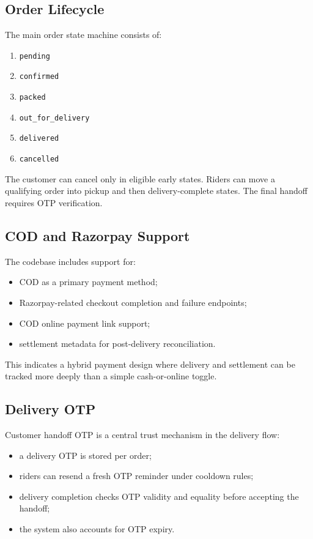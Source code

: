 \documentclass[12pt,a4paper]{article}
\begin{document}
\subsection{Order Lifecycle}
The main order state machine consists of:
\begin{enumerate}[leftmargin=1.5em]
    \item \texttt{pending}
    \item \texttt{confirmed}
    \item \texttt{packed}
    \item \texttt{out\_for\_delivery}
    \item \texttt{delivered}
    \item \texttt{cancelled}
\end{enumerate}

The customer can cancel only in eligible early states. Riders can move a qualifying order into pickup and then delivery-complete states. The final handoff requires OTP verification.

\subsection{COD and Razorpay Support}
The codebase includes support for:
\begin{itemize}[leftmargin=1.5em]
    \item COD as a primary payment method;
    \item Razorpay-related checkout completion and failure endpoints;
    \item COD online payment link support;
    \item settlement metadata for post-delivery reconciliation.
\end{itemize}

This indicates a hybrid payment design where delivery and settlement can be tracked more deeply than a simple cash-or-online toggle.

\subsection{Delivery OTP}
Customer handoff OTP is a central trust mechanism in the delivery flow:
\begin{itemize}[leftmargin=1.5em]
    \item a delivery OTP is stored per order;
    \item riders can resend a fresh OTP reminder under cooldown rules;
    \item delivery completion checks OTP validity and equality before accepting the handoff;
    \item the system also accounts for OTP expiry.
\end{itemize}
\end{document}
